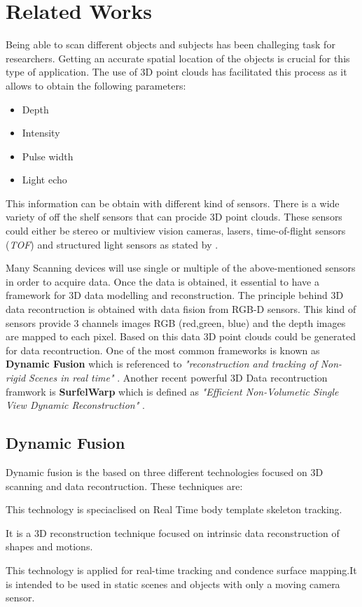 \documentclass[12pt]{report}
\begin{document}
\chapter{Related Works}
Being able to scan different objects and subjects has been challeging task for researchers. Getting an accurate spatial location of the objects is crucial for this  type of application.
The use of 3D point clouds has facilitated this process as it allows to obtain the following parameters:
\begin{itemize}[]
  \itemsep0em 
  \item Depth
  \item Intensity
  \item Pulse width
  \item Light echo
\end{itemize}
This information can be obtain with different kind of sensors. There is a wide variety of off the shelf sensors that can procide 3D point clouds. 
These sensors could either be stereo or multiview vision cameras, lasers, time-of-flight sensors (\textit{TOF}) and structured light sensors as stated by .

Many Scanning devices will use single or multiple of the above-mentioned sensors in order to acquire data. Once the data is obtained, it essential to have a framework for 3D data modelling and reconstruction.
The principle behind 3D data recontruction is obtained with data fision from RGB-D sensors. This kind of sensors provide 3 channels images RGB (red,green, blue) and the depth images are mapped to each pixel. Based on this data 3D point clouds could be generated for data recontruction.
One of the most common frameworks is known as \textbf{Dynamic Fusion} which is referenced to \textit{"reconstruction and tracking of Non-rigid Scenes in real time"} .
Another recent powerful 3D Data recontruction framwork is \textbf{SurfelWarp} which is defined as \textit{"Efficient Non-Volumetic Single View Dynamic Reconstruction"} .


\section{Dynamic Fusion}
Dynamic fusion is the based on three different technologies focused on 3D scanning and data recontruction. These techniques are: 

\begin{description}[style=nextline]
    \item[DART (Dense Articulated Real Time Tracking)] This technology is speciaclised  on Real Time body template skeleton tracking.
    \item[Animation Cartography] It is a 3D reconstruction technique  focused on intrinsic data reconstruction of shapes and motions. 
    \item[Kinect Fusion] This technology is applied for real-time tracking and condence surface mapping.It is intended to be used in static scenes and objects with only a moving camera sensor. 
\end{description} 
\end{document}
